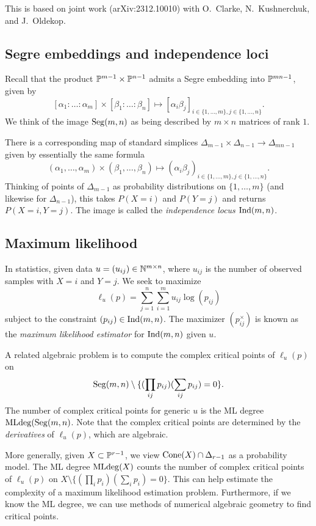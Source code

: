 \documentclass{amsart}
\begin{document}
This is based on joint work (arXiv:2312.10010) with O.\ Clarke, N.\ Kushnerchuk, and J.\ Oldekop.

\subsection{Segre embeddings and independence loci}

Recall that the product $\mathbb{P}^{m-1} \times \mathbb{P}^{n-1}$ admits a Segre embedding into $\mathbb{P}^{mn-1}$, given by
\[
	[\alpha_1 : \dots : \alpha_m] \times [\beta_1 : \dots : \beta_n] \mapsto [\alpha_i \beta_j]_{i \in \{1, \dots, m\}, j \in \{1, \dots, n\}}.
\]
We think of the image $\operatorname{Seg}(m,n)$ as being described by $m \times n$ matrices of rank $1$.

There is a corresponding map of standard simplices $\Delta_{m-1} \times \Delta_{n-1} \to \Delta_{mn-1}$ given by essentially the same formula
\[
	(\alpha_1, \dots, \alpha_m) \times (\beta_1, \dots, \beta_n) \mapsto (\alpha_i \beta_j)_{i \in \{1, \dots, m\}, j \in \{1, \dots, n\}}.
\]
Thinking of points of $\Delta_{m-1}$ as probability distributions on $\{1, \dots, m\}$ (and likewise for $\Delta_{n-1}$), this takes $P(X = i)$ and $P(Y = j)$ and returns $P(X = i, Y = j)$.
The image is called the \emph{independence locus} $\operatorname{Ind}(m,n)$.

\subsection{Maximum likelihood}

In statistics, given data $u = (u_{ij}) \in \mathbb{N}^{m \times n}$, where $u_{ij}$ is the number of observed samples with $X = i$ and $Y = j$.
We seek to maximize
\[
	\ell_u(p) = \sum_{j=1}^n \sum_{i=1}^m u_{ij} \log(p_{ij})
\]
subject to the constraint $(p_{ij}) \in \operatorname{Ind}(m,n)$.
The maximizer $(p_{ij}^\times)$ is known as the \emph{maximum likelihood estimator} for $\operatorname{Ind}(m,n)$ given $u$.

A related algebraic problem is to compute the complex critical points of $\ell_u(p)$ on 
\[
	\operatorname{Seg}(m,n) \setminus \{ (\prod_{ij} p_{ij}) (\sum_{ij} p_{ij}) = 0 \}.
\]
The number of complex critical points for generic $u$ is the ML degree $\operatorname{MLdeg}(\operatorname{Seg}(m, n)$.
Note that the complex critical points are determined by the \emph{derivatives} of $\ell_u(p)$, which are algebraic.

More generally, given $X \subset \mathbb{P}^{r-1}$, we view $\operatorname{Cone}(X) \cap \Delta_{r-1}$ as a probability model.
The ML degree $\operatorname{MLdeg}(X)$ counts the number of complex critical points of $\ell_u(p)$ on $X \setminus \{ (\prod_i p_i) (\sum_i p_i) = 0 \}$.
This can help estimate the complexity of a maximum likelihood estimation problem.
Furthermore, if we know the ML degree, we can use methods of numerical algebraic geometry to find critical points.
\end{document}
